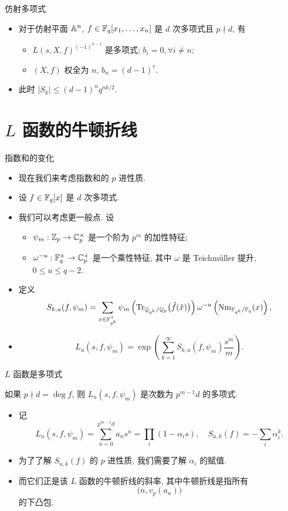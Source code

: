 \documentclass[aspectratio=169,handout]{ctexbeamer}
\begin{document}
\begin{frame}{仿射多项式}
	\begin{example}[][Serre1977]
		\begin{itemize}
			\item 对于仿射平面 ${\mathbb{A}}^n$, $f\in{\mathbb{F}}_q[x_1,\dots,x_n]$ 是 $d$ 次多项式且 $p\nmid d$, 有
			\begin{itemize}
				\item $L(s,X,f)^{(-1)^{n-1}}$ 是多项式; $b_i=0,\forall i\neq n$;
				\item $(X,f)$ 权全为 $n$, $b_n=(d-1)^r$.
			\end{itemize}
			\item 此时 $|S_k|\le (d-1)^nq^{nk/2}$.
		\end{itemize}
	\end{example}
\end{frame}


\section{$L$ 函数的牛顿折线}


\begin{frame}{指数和的变化}
	\begin{itemize}
		\item 现在我们来考虑指数和的 $p$ 进性质.
		\item 设 $f\in{\mathbb{F}}_q[x]$ 是 $d$ 次多项式.
		\item 我们可以考虑更一般点. 设
		\begin{itemize}
			\item $\psi_m:{\mathbb{Z}}_p\to{\mathbb{C}}_p^\times$ 是一个阶为 $p^m$ 的加性特征;
			\item $\omega^{-u}:{\mathbb{F}}_q^\times\to{\mathbb{C}}_p^\times$ 是一个乘性特征, 其中 $\omega$ 是 Teichm\"uller 提升, $0\le u\le q-2$.
		\end{itemize}
		\item 定义
		\[
			S_{k,u}(f,\psi_m)=\sum_{x\in{\mathbb{F}}_{q^k}^\times}\psi_m\left({\mathrm{Tr}}_{{\mathbb{Q}}_{q^k}/{\mathbb{Q}}_p}\bigl(\hat f(\hat x)\bigr)\right)\omega^{-u}\left({\mathrm{Nm}}_{{\mathbb{F}}_{q^k}/{\mathbb{F}}_q}(x)\right),
		\]
		\item 
		\[
			L_u(s,f,\psi_m)=\exp\left(\sum_{k=1}^\infty S_{k,u}(f,\psi_m)\frac{s^m}m\right).
		\]
	\end{itemize}
\end{frame}


\begin{frame}{$L$ 函数是多项式}
	\onslide<+->
	\begin{theorem}
		如果 $p\nmid d=\deg f$, 则 $L_u(s,f,\psi_m)$ 是次数为 $p^{m-1}d$ 的多项式.
	\end{theorem}
	\begin{itemize}
		\item 记
		\[
			L_u(s,f,\psi_m)=\sum_{n=0}^{p^{m-1}d} a_n s^n=\prod_i(1-\alpha_i s),
			\quad S_{u,k}(f)=-\sum_i \alpha_i^k.
		\]
		\item 为了了解 $S_{u,k}(f)$ 的 $p$ 进性质, 我们需要了解 $\alpha_i$ 的赋值.
		\item 而它们正是该 $L$ 函数的牛顿折线的斜率, 其中牛顿折线是指所有
		\[
			\bigl(n,v_p(a_n)\bigr)
		\]
		的下凸包.
	\end{itemize}
\end{frame}
\end{document}
